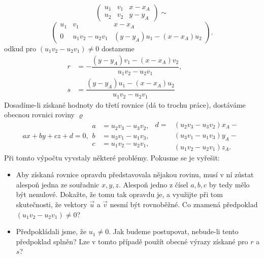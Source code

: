 \begin{mdframed}[style=mdexam]
\begin{example}
    \begin{equation*}
      \left(
        \begin{array}{rr|r}
          u_1 &  v_1  &  x-x_A         \\
          u_2 &  v_2  &  y-y_A
        \end{array}
      \right) \sim
    \end{equation*}
    \begin{equation*}
      \left(
        \begin{array}{cc|c}
                u_1 &  v_1               & x - x_A     \\
                0   &  u_1v_2 - u_2v_1   & (y-y_A)u_1 - (x-x_A)u_2
        \end{array}
      \right).
    \end{equation*}
    odkud pro \((u_1v_2 - u_2v_1) \neq 0\) dostaneme
    \begin{align*}
      r &= - \dfrac{(y-y_A)v_1 - (x-x_A)v_2}{u_1v_2 - u_2v_1}, \qquad  \\
      s &=   \dfrac{(y-y_A)u_1 - (x-x_A)u_2}{u_1v_2 - u_2v_1}
    \end{align*}
    Dosadíme-li získané hodnoty do třetí rovnice (dá to trochu práce), dostáváme obecnou  rovnici
    roviny \(\varrho\)
    \begin{subequations}\label{mai:eq041}
      \begin{equation}
        ax + by + cz + d= 0,  \label{mai:eq041a}
      \end{equation}
      \begin{align}
        a &= u_2v_3 - u_3v_2, \nonumber           \\
        b &= u_3v_1 - u_1v_3, \label{mai:eq041b}  \\ 
        c &= u_1v_2 - u_2v_1, \nonumber 
      \end{align}
      \begin{align}
        d = &(u_2v_3 - u_3v_2)x_A - \nonumber          \\
            &(u_3v_1 - u_1v_3)y_A - \label{mai:eq041c} \\
            &(u_1v_2 - u_2v_1)z_A.  \nonumber
      \end{align}
    \end{subequations}
    Při tomto výpočtu vyvstaly některé problémy. Pokusme se je vyřešit:
    \begin{itemize}[noitemsep]
      \item Aby získaná rovnice opravdu představovala nějakou rovinu, musí v ní zůstat alespoň jedna
            ze souřadnic \(x, y, z\). Alespoň jedno z čísel \(a, b, c\) by tedy mělo být nenulové.
            Dokažte, že tomu tak opravdu je, a využijte při tom skutečnosti, že vektory \(\vec{u}\)
            a \(\vec{v}\) nesmí být rovnoběžné. Co znamená předpoklad \((u_1v_2 - u_2v_1) \neq 0\)?
      \item Předpokládali jsme, že \(u_1 \neq 0\). Jak budeme postupovat, nebude-li tento předpoklad
            splněn? Lze v tomto případě použít obecné výrazy získané pro \(r\) a \(s\)?
    \end{itemize}
  \end{example}
\end{mdframed}